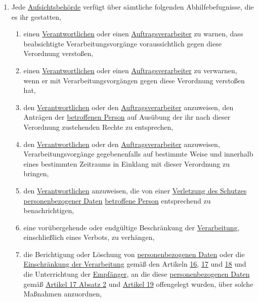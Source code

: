 \begin{enumerate}
\begin{enumerate}
  \end{enumerate}

  \item Jede \hyperref[itm:04-21]{Aufsichtsbehörde} verfügt über sämtliche folgenden Abhilfebefugnisse, die es ihr
   gestatten,%
  \label{itm:58-2}

  \begin{enumerate}
  
    \item einen \hyperref[itm:04-7]{Verantwortlichen} oder einen \hyperref[itm:04-8]{Auftragsverarbeiter} zu warnen,
     dass beabsichtigte Verarbeitungsvorgänge voraussichtlich gegen diese Verordnung verstoßen,%
    \label{itm:58-2a}

    \item einen \hyperref[itm:04-7]{Verantwortlichen} oder einen \hyperref[itm:04-8]{Auftragsverarbeiter} zu verwarnen,
     wenn er mit Verarbeitungsvorgängen gegen diese Verordnung verstoßen hat,%
    \label{itm:58-2b}

    \item den \hyperref[itm:04-7]{Verantwortlichen} oder den \hyperref[itm:04-8]{Auftragsverarbeiter} anzuweisen, den
     Anträgen der \hyperref[itm:04-1]{betroffenen Person} auf Ausübung der ihr nach dieser Verordnung zustehenden
     Rechte zu entsprechen,%
    \label{itm:58-2c}

    \item den \hyperref[itm:04-7]{Verantwortlichen} oder den \hyperref[itm:04-8]{Auftragsverarbeiter} anzuweisen,
     Verarbeitungsvorgänge gegebenenfalls auf bestimmte Weise und innerhalb eines bestimmten Zeitraums in Einklang mit
     dieser Verordnung zu bringen,%
    \label{itm:58-2d}

    \item den \hyperref[itm:04-7]{Verantwortlichen} anzuweisen, die von einer \hyperref[itm:04-12]{Verletzung des
     Schutzes personenbezogener Daten} \hyperref[itm:04-1]{betroffene Person} entsprechend zu benachrichtigen,%
    \label{itm:58-2e}

    \item eine vorübergehende oder endgültige Beschränkung der \hyperref[itm:04-2]{Verarbeitung}, einschließlich eines
     Verbots, zu verhängen,%
    \label{itm:58-2f}

    \item die Berichtigung oder Löschung von \hyperref[itm:04-1]{personenbezogenen Daten} oder die \hyperref[itm:04-3]
     {Einschränkung der Verarbeitung} gemäß den Artikeln \hyperref[ch:16]{16}, \hyperref[ch:17]{17} und \hyperref
     [ch:17]{18} und die Unterrichtung der \hyperref[itm:04-9]{Empfänger}, an die diese \hyperref[itm:04-1]
     {personenbezogenen Daten} gemäß \hyperref[itm:17-2]{Artikel 17 Absatz 2} und \hyperref[ch:19]{Artikel 19}
     offengelegt wurden, über solche Maßnahmen anzuordnen,%
    \label{itm:58-2g}


\end{enumerate}
\end{enumerate}
